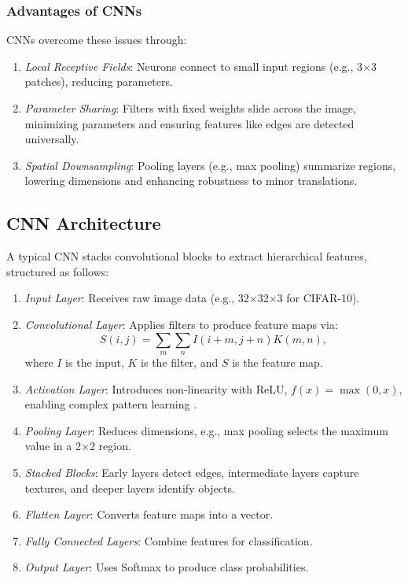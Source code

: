 \documentclass[UTF8]{report}
\theoremstyle{MyLineTheoremStyle} %
\theoremstyle{MyBlockTheoremStyle} %
\theoremstyle{MySubsubsectionStyle} %
\begin{document}
\subsubsection{Advantages of CNNs}

CNNs overcome these issues through:

\begin{enumerate}[label=\roman*.]
    \item \textit{Local Receptive Fields}: Neurons connect to small input regions (e.g., 3$\times$3 patches), reducing parameters.
    \item \textit{Parameter Sharing}: Filters with fixed weights slide across the image, minimizing parameters and ensuring features like edges are detected universally.
    \item \textit{Spatial Downsampling}: Pooling layers (e.g., max pooling) summarize regions, lowering dimensions and enhancing robustness to minor translations.
\end{enumerate}

\subsection{CNN Architecture}

A typical CNN stacks convolutional blocks to extract hierarchical features, structured as follows:

\begin{enumerate}[label=\roman*.]
    \item \textit{Input Layer}: Receives raw image data (e.g., 32$\times$32$\times$3 for CIFAR-10).
    \item \textit{Convolutional Layer}: Applies filters to produce feature maps via:
        \[
        S(i, j) = \sum_{m} \sum_{n} I(i + m, j + n) K(m, n),
        \]
        where $I$ is the input, $K$ is the filter, and $S$ is the feature map.
    \item \textit{Activation Layer}: Introduces non-linearity with ReLU, $f(x) = \max(0, x)$, enabling complex pattern learning \cite{relu}.
    \item \textit{Pooling Layer}: Reduces dimensions, e.g., max pooling selects the maximum value in a 2$\times$2 region.
    \item \textit{Stacked Blocks}: Early layers detect edges, intermediate layers capture textures, and deeper layers identify objects.
    \item \textit{Flatten Layer}: Converts feature maps into a vector.
    \item \textit{Fully Connected Layers}: Combine features for classification.
    \item \textit{Output Layer}: Uses Softmax to produce class probabilities.
\end{enumerate}
\end{document}
